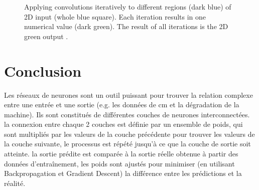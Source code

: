 \begin{figure}[H]
\begin{subfigure}{0.22\linewidth}
    \end{subfigure}
    \caption{Applying convolutions iteratively to different regions (dark blue) of 2D input (whole blue square). Each iteration results in one numerical value (dark green). The result of all iterations is the 2D green output \cite{dumoulin2016guide}.}
    \label{fig:convolutions}
\end{figure}

\section{Conclusion}
Les réseaux de neurones sont un outil puissant pour trouver la relation complexe entre une entrée et une sortie (e.g. les données de \acrlong{cm} et la dégradation de la machine). Ils sont constitués de différentes couches de neurones interconnectées. la connexion entre chaque 2 couches est définie par un ensemble de poids, qui sont multipliés par les valeurs de la couche précédente pour trouver les valeurs de la couche suivante, le processus est répété jusqu'à ce que la couche de sortie soit atteinte. la sortie prédite est comparée à la sortie réelle obtenue à partir des données d'entraînement, les poids sont ajustés pour minimiser (en utilisant Backpropagation et Gradient Descent) la différence entre les prédictions et la réalité.